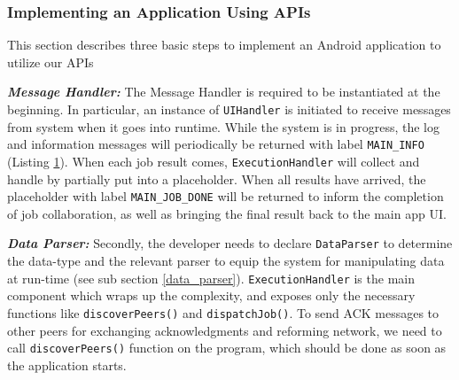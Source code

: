 \documentclass{sig-alternate}[10pt]
\begin{document}
\subsubsection{Implementing an Application Using APIs}
This section describes three basic steps to implement an Android application to utilize our APIs

\textbf{\emph{Message Handler:}}
The Message Handler is required to be instantiated at the beginning. In particular, an instance of \texttt{UIHandler} is initiated to receive messages from system when it goes into runtime. While the system is in progress, the log and information messages will periodically be returned with label \texttt{MAIN\_INFO} (Listing \ref{ui_handler}). When each job result comes, \texttt{ExecutionHandler} will collect and handle by partially put into a placeholder. When all results have arrived, the placeholder with label \texttt{MAIN\_JOB\_DONE} will be returned to inform the completion of job collaboration, as well as bringing the final result back to the main app UI.

\begin{figure}
\noindent {}
\label{ui_handler}
\end{figure}

\textbf{\emph{Data Parser:}}
Secondly, the developer needs to declare \texttt{DataParser} to determine the data-type and the relevant parser to equip the system for manipulating data at run-time (see sub section \ref{data_parser}). \texttt{ExecutionHandler} is the main component which wraps up the complexity, and exposes only the necessary functions like \texttt{discoverPeers()} and \texttt{dispatchJob()}. To send ACK messages to other peers for exchanging acknowledgments and reforming network, we need to call \texttt{discoverPeers()} function on the program, which should be done as soon as the application starts.

\begin{figure}
\noindent {}	
  \label{code:get_single_part}

\end{figure}
\end{document}

